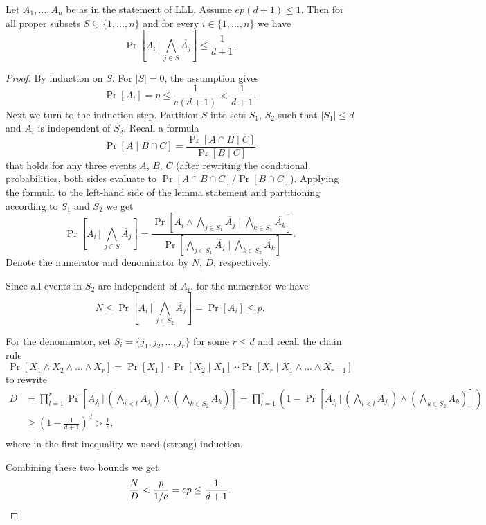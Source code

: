 \begin{lemma} Let $A_1,\dots,A_n$ be as in the statement of LLL.
Assume $ep(d+1)\leq 1$. Then for all proper subsets $S\subsetneq\{1,\dots,n\}$ and for every $i\in\{1,\dots,n\}$ we have
$$\Pr\left[A_i \,\Big|\, \bigwedge_{j\in S} \overline{A_j}\right] \leq\frac1{d+1}.
$$
\end{lemma}
\begin{proof}
By induction on $S$. For $|S|=0$, the assumption gives $$\Pr[A_i]=p\leq\frac1{e(d+1)}<\frac1{d+1}.$$
Next we turn to the induction step. Partition $S$ into sets $S_1$, $S_2$ such that $|S_1|\leq d$ and $A_i$ is independent of $S_2$. Recall a formula
$$\Pr[A\mid B\cap C]=\frac{\Pr[A\cap B\mid C]}{\Pr[B\mid C]}
$$
that holds for any three events $A$, $B$, $C$ (after rewriting the conditional probabilities, both sides evaluate to $\Pr[A\cap B\cap C]/\Pr[B\cap C]$). Applying the formula to the left-hand side of the lemma statement and partitioning according to $S_1$ and $S_2$ we get
$$
\Pr\left[A_i \,\Big|\, \bigwedge_{j\in S} \overline{A_j}\right] = \frac{\Pr\left[ A_i\wedge \bigwedge_{j\in S_1} \overline{A_j} \mid \bigwedge_{k\in S_2} \overline{A_k} \right]} {\Pr\left[ \bigwedge_{j\in S_1} \overline{A_j} \mid \bigwedge_{k\in S_2} \overline{A_k} \right]}.
$$
Denote the numerator and denominator by $N$, $D$, respectively.

Since all events in $S_2$ are independent of $A_i$, for the numerator we have $$N\leq \Pr\left[ A_i \,\Big|\,  \bigwedge_{j\in S_2} \overline{A_j} \right]=\Pr[A_i]\leq p.$$

For the denominator, set $S_i=\{j_1,j_2,\dots, j_r\}$ for some $r\leq d$ and recall the chain rule
$$\Pr[X_1\wedge X_2\wedge\dots\wedge X_r]=\Pr[X_1]\cdot \Pr[X_2\mid X_1]\cdots\Pr[X_r\mid X_1\wedge \dots\wedge X_{r-1}]$$
to rewrite
\begin{align*}
D&=\prod_{l=1}^r \Pr\left[\overline{A_{j_l}} \,\Big|\,  \left(\bigwedge_{i<l} \overline{A_{j_i}}\right)\wedge \left(\bigwedge_{k\in S_2} \overline{A_k}\right)\right]=\prod_{l=1}^r\left(1-\Pr\left[A_{j_l}\,\Big|\,   \left(\bigwedge_{i<l} \overline{A_{j_i}}\right)\wedge \left(\bigwedge_{k\in S_2} \overline{A_k}\right)\right] \right)\\
&\geq \left(1-\frac1{d+1}\right)^d>\frac1e,\\
\end{align*}
where in the first inequality we used (strong) induction.

Combining these two bounds we get
\[ \frac ND <\frac p{1/e} =ep\leq\frac1{d+1}. \qedhere \]
\end{proof}

